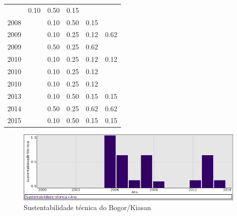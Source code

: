 \begin{table}[H]
\begin{tabular}{| l | c | c | c | c | c |}
          &
          0.10
          &
          0.50
          &
          0.15
          &
          \\
            2008
          &
          
          &
          0.10
          &
          0.50
          &
          0.15
          &
          \\
\hline
            2009
          &
          
          &
          0.10
          &
          0.25
          &
          0.12
          &
            {\color{blue} 0.62}
          \\
            2009
          &
          
          &
          0.50
          &
          0.25
          &
          0.62
          &
          \\
\hline
            2010
          &
          
          &
          0.10
          &
          0.25
          &
          0.12
          &
            {\color{red} 0.12}
          \\
            2010
          &
          
          &
          0.10
          &
          0.25
          &
          0.12
          &
          \\
            2010
          &
          
          &
          0.10
          &
          0.25
          &
          0.12
          &
          \\
\hline
            2013
          &
          
          &
          0.10
          &
          0.50
          &
          0.15
          &
            {\color{red} 0.15}
          \\
\hline
            2014
          &
          
          &
          0.50
          &
          0.25
          &
          0.62
          &
            {\color{blue} 0.62}
          \\
\hline
            2015
          &
          
          &
          0.10
          &
          0.50
          &
          0.15
          &
            {\color{red} 0.15}
          \\
\hline
\end{tabular}
\end{table}

\begin{figure}[h]
  \center
  \includegraphics[scale=0.50]{imagens/softwares-charts/kiasan.png}
  \caption{Sustentabilidade técnica do Bogor/Kiasan}
\end{figure}


